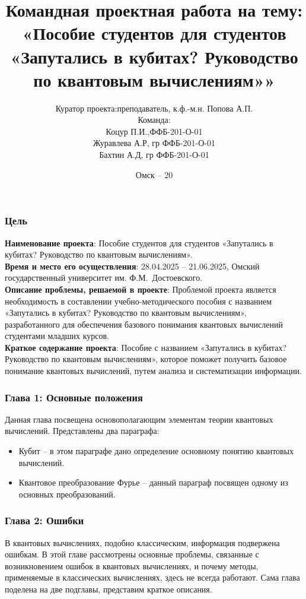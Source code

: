 \documentclass{beamer}
\title[Пособие]
{ Командная проектная работа
	на тему: «Пособие студентов для студентов «Запутались в кубитах?  Руководство по квантовым вычислениям»»}
\author[Журавлева А.Р, Коцур П.И, Бахтин А.Д.]
{Куратор проекта:преподаватель, к.ф.-м.н.
	Попова А.П.\\
	Команда:\\ Коцур П.И.,ФФБ-201-О-01\\
	Журавлева А.Р, гр ФФБ-201-О-01\\
	Бахтин А.Д, гр ФФБ-201-О-01}
\institute[ОмГУ]
{
	ОмГУ им. Ф.М.~Достоевского\\[5pt]
	
}
\date[Омск -- 20\Year]
{Омск -- 20\Year}
\begin{document}
	
	\frame{\titlepage}
	
	
	\begin{frame}\frametitle{Цель}
		\justifying \textbf {Наименование проекта}: Пособие студентов для студентов «Запутались в кубитах?  Руководство по квантовым вычислениям».\\
		
		\justifying \textbf{Время и место его осуществления}: 28.04.2025 – 21.06.2025, Омский государственный университет им. Ф.М. Достоевского.\\
		
		\justifying \textbf {Описание проблемы, решаемой в проекте}: Проблемой проекта является необходимость в составлении учебно-методического пособия с названием «Запутались в кубитах?  Руководство по квантовым вычислениям», разработанного для обеспечения базового понимания квантовых вычислений студентами младших курсов.\\
		
		\justifying  \textbf{Краткое содержание проекта}: Пособие с названием «Запутались в кубитах?  Руководство по квантовым вычислениям», которое поможет получить базовое понимание квантовых вычислений, путем анализа и систематизации информации. \\
	\end{frame}
	
	
	\begin{frame}\frametitle{Глава 1: Основные положения}
		\justifying
		Данная глава посвещена основополагающим элементам теории квантовых вычислений. Представлены два параграфа:
		\begin{itemize}
			\item \justifying Кубит -- в этом параграфе дано определение основному понятию квантовых вычислений.
			\item \justifying Квантовое преобразование Фурье -- данный параграф посвящен одному из основных преобразований.
		\end{itemize}
		
	\end{frame}	
	\begin{frame}\frametitle{Глава 2: Ошибки}
		\justifying
		В квантовых вычислениях, подобно классическим, информация подвержена ошибкам. В этой главе  рассмотрены основные проблемы, связанные с возникновением ошибок в квантовых вычислениях, и почему методы, применяемые в классических вычислениях, здесь не всегда работают. Сама глава поделена на две подглавы, представим краткое описания.
		
	\end{frame}
	
\end{document}
